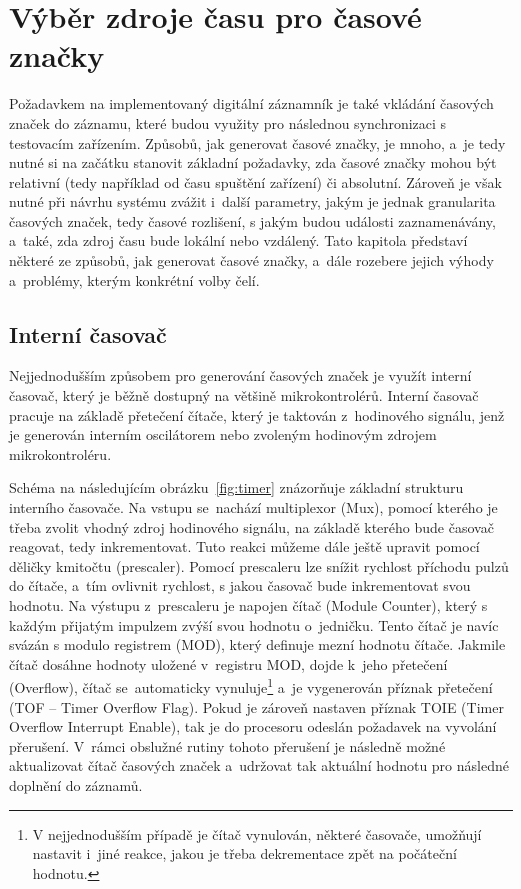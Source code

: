 \section{Výběr zdroje času pro časové značky}
\label{zdroje_casu}
Požadavkem na implementovaný digitální záznamník je také vkládání časových značek do záznamu, které budou využity pro následnou synchronizaci s testovacím zařízením. Způsobů, jak generovat časové značky, je mnoho, a~je tedy nutné si na začátku stanovit základní požadavky, zda časové značky mohou být relativní (tedy například od času spuštění zařízení) či absolutní. Zároveň je však nutné při návrhu systému zvážit i~další parametry, jakým je jednak granularita časových značek, tedy časové rozlišení, s jakým budou události zaznamenávány, a~také, zda zdroj času bude lokální nebo vzdálený. Tato kapitola představí některé ze způsobů, jak generovat časové značky, a~dále rozebere jejich výhody a~problémy, kterým konkrétní volby čelí.~\cite{perny2008zarizeni_cas_znacky}

\subsection{Interní časovač}
Nejjednodušším způsobem pro generování časových značek je využít interní časovač, který je běžně dostupný na většině mikrokontrolérů. Interní časovač pracuje na základě přetečení čítače, který je taktován z~hodinového signálu, jenž je generován interním oscilátorem nebo zvoleným hodinovým zdrojem mikrokontroléru.~\cite{nxp_KL05_Reference_Manual}

Schéma na následujícím obrázku~\ref{fig:timer} znázorňuje základní strukturu interního časovače. Na vstupu se~nachází multiplexor (Mux), pomocí kterého je třeba zvolit vhodný zdroj hodinového signálu, na základě kterého bude časovač reagovat, tedy inkrementovat. Tuto reakci můžeme dále ještě upravit pomocí děličky kmitočtu (prescaler). Pomocí prescaleru lze snížit rychlost příchodu pulzů do čítače, a~tím ovlivnit rychlost, s jakou časovač bude inkrementovat svou hodnotu. Na výstupu z~prescaleru je napojen čítač (Module Counter), který s každým přijatým impulzem zvýší svou hodnotu o~jedničku. Tento čítač je navíc svázán s modulo registrem (MOD), který definuje mezní hodnotu čítače. Jakmile čítač dosáhne hodnoty uložené v~registru MOD, dojde k~jeho přetečení (Overflow), čítač se~automaticky vynuluje\footnote{V nejjednodušším případě je čítač vynulován, některé časovače, umožňují nastavit i~jiné reakce, jakou je třeba dekrementace zpět na počáteční hodnotu.} a~je vygenerován příznak přetečení (TOF -- Timer Overflow Flag). Pokud je zároveň nastaven příznak TOIE (Timer Overflow Interrupt Enable), tak je do procesoru odeslán požadavek na vyvolání přerušení. V~rámci obslužné rutiny tohoto přerušení je následně možné aktualizovat čítač časových značek a~udržovat tak aktuální hodnotu pro následné doplnění do záznamů.~\cite{nxp_KL05_Reference_Manual}

